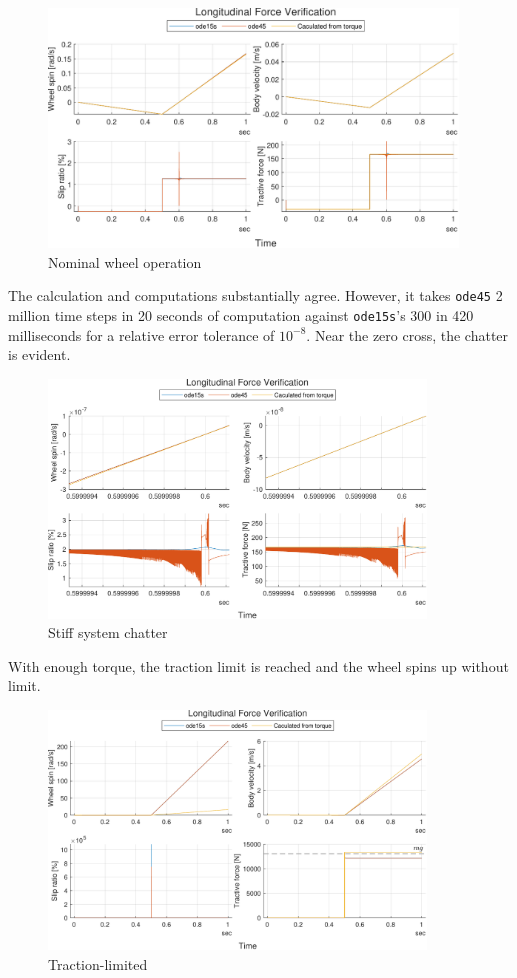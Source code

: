 \documentclass[9pt]{extarticle}
\begin{document}
\begin{figure}[H]
	\centering
	\includegraphics[height=2.5in]{fig/nominal_wheel.pdf}
	\caption{Nominal wheel operation}
\end{figure}

The calculation and computations substantially agree. However, it takes
\verb|ode45| 2 million time steps in 20 seconds of computation against
\verb|ode15s|'s 300 in 420 milliseconds for a relative error tolerance of
\(10^{-8}\). Near the zero cross, the chatter is evident.

\begin{figure}[H]
	\centering
	\includegraphics[height=2.5in]{fig/chatter_demo.pdf}
	\caption{Stiff system chatter}
\end{figure}

With enough torque, the traction limit is reached and the wheel spins up without
limit.
\begin{figure}[H]
	\centering
	\includegraphics[height=2.5in]{fig/saturated_wheel.pdf}
	\caption{Traction-limited}
\end{figure}
\end{document}

